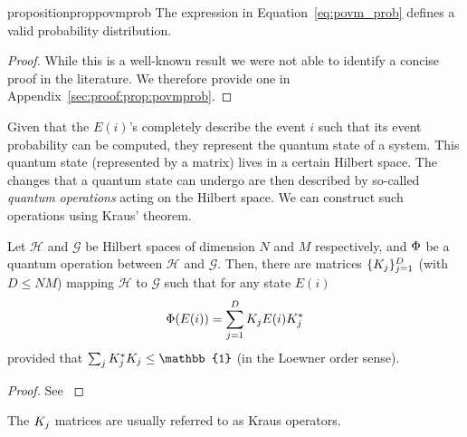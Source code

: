 



\begin{restatable}{proposition}{proppovmprob}
	\label{prop:povmprob}
	The expression in Equation~\ref{eq:povm_prob} defines a valid probability distribution.
\end{restatable}

\begin{proof}
	While this is a well-known result we were not able to identify a concise proof in the literature. We therefore provide one in Appendix~\ref{sec:proof:prop:povmprob}.
\end{proof}

Given that the $E(i)$'s completely describe the event $i$ such that its event probability can be computed, they represent the quantum state of a system. This quantum state (represented by a matrix) lives in a certain Hilbert space. The changes that a quantum state can undergo are then described by so-called \textit{quantum operations} acting on the Hilbert space. We can construct such operations using Kraus' theorem.


\begin{theorem}
	Let $\mathcal{H}$  and $\mathcal {G}$ be Hilbert spaces of dimension $N$ and $M$ respectively, and $\Phi$ be a quantum operation between $\mathcal{H}$  and $\mathcal {G}$. Then, there are matrices
	$\{ K_j \}_{j=1}^{D}$ (with $D\leq NM$)
	mapping $\mathcal{H}$ to $\mathcal {G}$ such that for any state $E(i)$
	\begin{align}
		\Phi(E(i)) = \sum_{j=1}^{D} K_j E(i) K_j^*
	\end{align}
	provided that $ \sum _{j} \kraus_{j}^{*} \kraus_{j}\leq \mathbb {1} $ (in the Loewner order sense).
\end{theorem}

\begin{proof}
	See \citep[Chapter 8]{nielsen2001quantum}
\end{proof}
The $K_j$ matrices are usually referred to as Kraus operators.







